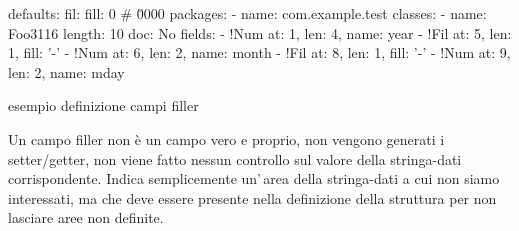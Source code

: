 \documentclass[a4paper,10pt]{report}
\newif\ifesource
\newenvironment{elisting}[1][H]
  {\captionsetup{aboveskip=0pt}\begin{listing}[#1]}
  {\end{listing}%
}
\begin{document}
\ifesource
\begin{figure*}[!htb]
\begin{lstlisting}[language=yaml, 
caption={esempio definizione campi filler}, 
label=lst:xmplFil]
defaults:
  fil:
    fill: 0             # \u0000
packages:
  - name: com.example.test
    classes:
      - name: Foo3116
        length: 10
        doc: No
        fields:
          - !Num { at: 1, len: 4, name: year }
          - !Fil { at: 5, len: 1, fill: '-' }
          - !Num { at: 6, len: 2, name: month }
          - !Fil { at: 8, len: 1, fill: '-' }
          - !Num { at: 9, len: 2, name: mday }
\end{lstlisting}
\end{figure*}
\else
\begin{elisting}[!htb]
\begin{yamlcode}
defaults:
  fil:
    fill: 0             # \u0000
packages:
  - name: com.example.test
    classes:
      - name: Foo3116
        length: 10
        doc: No
        fields:
          - !Num { at: 1, len: 4, name: year }
          - !Fil { at: 5, len: 1, fill: '-' }
          - !Num { at: 6, len: 2, name: month }
          - !Fil { at: 8, len: 1, fill: '-' }
          - !Num { at: 9, len: 2, name: mday }
\end{yamlcode}
\caption{esempio definizione campi filler}
\label{lst:xmplFil}
\end{elisting}
\fi
Un campo filler non è un campo vero e proprio, non vengono generati i
setter/getter, non viene fatto nessun controllo sul valore della stringa-dati
corrispondente. Indica semplicemente un'\,area della stringa-dati a cui non 
siamo interessati, ma che deve essere presente nella definizione della 
struttura per non lasciare aree non definite.
\end{document}
